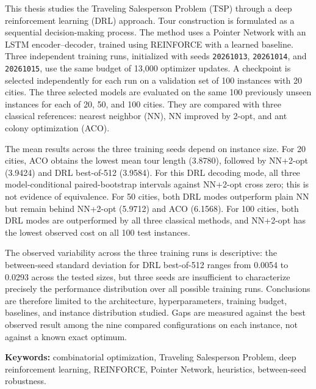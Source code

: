 \documentclass[12pt, a4paper, twoside, openright]{book}
\begin{document}
\begin{tcolorbox}[
enhanced,
colback=ThRed!4,
colframe=ThRed,
boxsep=2mm,
left=2mm,
right=2mm,
top=1mm,
bottom=1mm,
fontupper=\small,
]
This thesis studies the Traveling Salesperson Problem (TSP) through a
deep reinforcement learning (DRL) approach. Tour construction is
formulated as a sequential decision-making process. The method uses a
Pointer Network with an LSTM encoder--decoder, trained using REINFORCE
with a learned baseline. Three independent training runs, initialized
with seeds \texttt{20261013}, \texttt{20261014}, and \texttt{20261015},
use the same budget of 13,000 optimizer updates. A checkpoint is selected
independently for each run on a validation set of 100 instances with 20
cities. The three selected models are evaluated on the same 100 previously
unseen instances for each of 20, 50, and 100 cities. They are compared with
three classical references: nearest neighbor (NN), NN improved by 2-opt,
and ant colony optimization (ACO).

The mean results across the three training seeds depend on instance size.
For 20 cities, ACO obtains the lowest mean tour length (3.8780), followed
by NN+2-opt (3.9424) and DRL best-of-512 (3.9584). For this DRL decoding
mode, all three model-conditional paired-bootstrap intervals against
NN+2-opt cross zero; this is not evidence of equivalence. For 50 cities,
both DRL modes outperform plain NN but remain behind NN+2-opt (5.9712)
and ACO (6.1568). For 100 cities, both DRL modes are outperformed by all
three classical methods, and NN+2-opt has the lowest observed cost on all
100 test instances.

The observed variability across the three training runs is descriptive:
the between-seed standard deviation for DRL best-of-512 ranges from
0.0054 to 0.0293 across the tested sizes, but three seeds are insufficient
to characterize precisely the performance distribution over all possible
training runs. Conclusions are therefore limited to the architecture,
hyperparameters, training budget, baselines, and instance distribution
studied. Gaps are measured against the best observed result among the nine
compared configurations on each instance, not against a known exact optimum.

\medskip
\textbf{Keywords:} combinatorial optimization, Traveling Salesperson
Problem, deep reinforcement learning, REINFORCE, Pointer Network,
heuristics, between-seed robustness.
\end{tcolorbox}

\cleardoublepage
	
\end{document}
